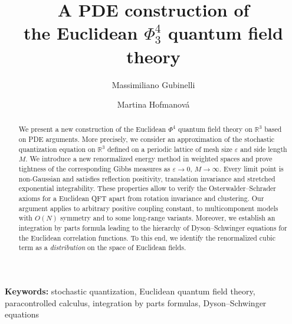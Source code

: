 \documentclass[a4paper,11pt]{article}
\numberwithin{equation}{section}
\newcommand{\tmkeywords}{\textbf{Keywords:} }
\begin{document}
\title{A PDE construction of \\ the Euclidean $\Phi^4_3$ quantum field theory}

\author[1]{Massimiliano Gubinelli}
\author[2]{Martina Hofmanov\'a}
%


\maketitle

\begin{abstract}
  We present a new construction of the Euclidean $\Phi^4$ quantum
  field theory on $\mathbb{R}^3$ based on PDE arguments. More precisely, we
  consider an approximation of the stochastic quantization equation on
  $\mathbb{R}^3$ defined on a periodic lattice of mesh size $\varepsilon$ and
  side length $M$. We introduce 
  a new renormalized energy method in weighted spaces and prove tightness of the corresponding Gibbs measures as
  $\varepsilon \rightarrow 0$, $M \rightarrow \infty$. Every limit point is non-Gaussian and satisfies reflection positivity, translation invariance and stretched exponential integrability. These properties allow to verify the Osterwalder--Schrader axioms for a  Euclidean QFT apart from rotation invariance and clustering. Our argument applies to arbitrary positive coupling constant, to multicomponent models with $O(N)$ symmetry and to some long-range variants. Moreover, we establish an integration by parts formula leading to the hierarchy of Dyson--Schwinger equations for the Euclidean correlation functions. To this end, we identify the renormalized cubic term as a \emph{distribution} on the space of Euclidean fields.
\end{abstract}

\tmkeywords{stochastic quantization, Euclidean quantum field theory,
paracontrolled calculus, integration by parts formulas, Dyson--Schwinger equations}
\end{document}
